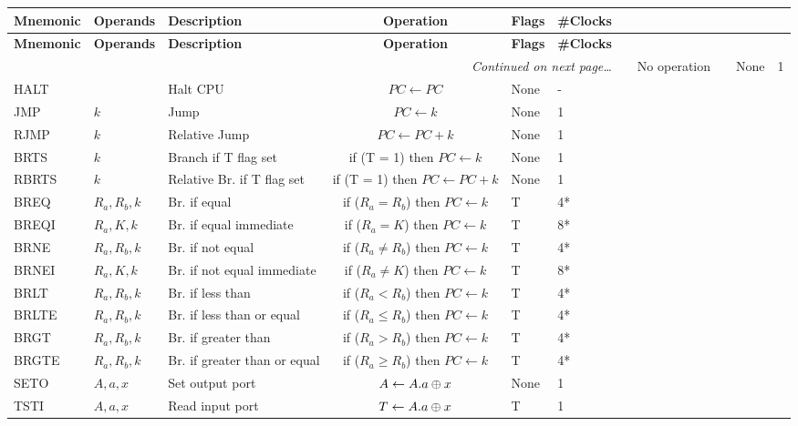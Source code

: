 \documentclass[12pt,twoside]{report}
\begin{document}
{\scriptsize
\begin{longtable}{ | l | l | l | c | l | l | }
  \hline
  \textbf{Mnemonic} & \textbf{Operands} & \textbf{Description} & \textbf{Operation} & \textbf{Flags} & \textbf{\#Clocks} \\
  \hline
\endfirsthead
  \hline
  \textbf{Mnemonic} & \textbf{Operands} & \textbf{Description} & \textbf{Operation} & \textbf{Flags} & \textbf{\#Clocks} \\
  \hline

\endhead
  \hline
  \multicolumn{6}{r}{\emph{Continued on next page\ldots}}
\endfoot

\endlastfoot
NOP & & No operation & & None & 1 \\
HALT & & Halt CPU & $PC \leftarrow PC$ & None & - \\
JMP & $k$ & Jump & $PC \leftarrow k$ & None & 1 \\
RJMP & $k$ & Relative Jump & $PC \leftarrow PC + k$  & None & 1 \\
BRTS & $k$ & Branch if T flag set & if (T = 1) then $PC \leftarrow k$  & None & 1 \\
RBRTS & $k$ & Relative Br. if T flag set & if (T = 1) then $PC \leftarrow PC + k$  & None & 1 \\
BREQ & $R_a, R_b, k$ & Br. if equal & if ($R_a = R_b$) then $PC \leftarrow k$ & T & 4* \\
BREQI & $R_a, K, k$ & Br. if equal immediate & if ($R_a = K$) then $PC \leftarrow k$ & T & 8* \\
BRNE & $R_a, R_b, k$ & Br. if not equal & if ($R_a \neq R_b$) then $PC \leftarrow k$ & T & 4* \\
BRNEI & $R_a, K, k$ & Br. if not equal immediate & if ($R_a \neq K$) then $PC \leftarrow k$ & T & 8* \\
BRLT & $R_a, R_b, k$ & Br. if less than & if ($R_a < R_b$) then $PC \leftarrow k$ & T & 4* \\
BRLTE & $R_a, R_b, k$ & Br. if less than or equal & if ($R_a \le R_b$) then $PC \leftarrow k$ & T & 4* \\
BRGT & $R_a, R_b, k$ & Br. if greater than & if ($R_a > R_b$) then $PC \leftarrow k$ & T & 4* \\
BRGTE & $R_a, R_b, k$ & Br. if greater than or equal & if ($R_a \ge R_b$) then $PC \leftarrow k$ & T & 4* \\
SETO & $A, a, x$ & Set output port & $A \leftarrow A . a \mathbin{\oplus} x$  & None & 1 \\
TSTI & $A, a, x$ & Read input port & $T \leftarrow A . a \mathbin{\oplus} x$  & T & 1 \\

\end{longtable}}
\end{document}
